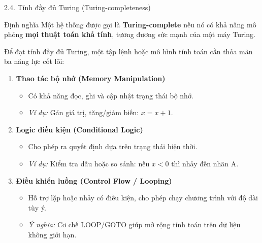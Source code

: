 \documentclass[10pt, aspectratio=169]{beamer}
\begin{document}
\begin{frame}{2.4. Tính đầy đủ Turing (Turing-completeness)}

\begin{block}{Định nghĩa}
Một hệ thống được gọi là \textbf{Turing-complete} nếu nó có khả năng mô phỏng
\textbf{mọi thuật toán khả tính}, tương đương sức mạnh của một máy Turing.
\end{block}

\vspace{1em}

Để đạt tính đầy đủ Turing, một tập lệnh hoặc mô hình tính toán cần thỏa mãn ba
năng lực cốt lõi:

\begin{enumerate}
    \item \textbf{Thao tác bộ nhớ (Memory Manipulation)}
    \begin{itemize}
        \item Có khả năng đọc, ghi và cập nhật trạng thái bộ nhớ.
        \item \textit{Ví dụ:} Gán giá trị, tăng/giảm biến: $x = x + 1$.
    \end{itemize}

    \item \textbf{Logic điều kiện (Conditional Logic)}
    \begin{itemize}
        \item Cho phép ra quyết định dựa trên trạng thái hiện thời.
        \item \textit{Ví dụ:} Kiểm tra dấu hoặc so sánh: nếu $x < 0$ thì nhảy đến nhãn A.
    \end{itemize}

    \item \textbf{Điều khiển luồng (Control Flow / Looping)}
    \begin{itemize}
        \item Hỗ trợ lặp hoặc nhảy có điều kiện, cho phép chạy chương trình với độ dài tùy ý.
        \item \textit{Ý nghĩa:} Cơ chế LOOP/GOTO giúp mở rộng tính toán trên dữ liệu không giới hạn.
    \end{itemize}
\end{enumerate}



\end{frame}
\end{document}

